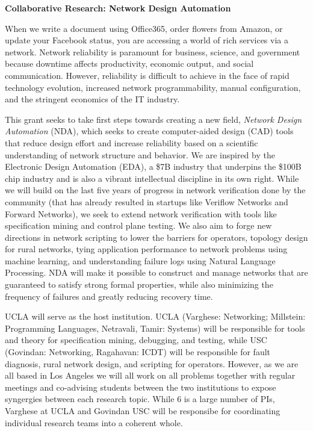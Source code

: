 \centerline{\large\textbf{Collaborative Research: Network Design Automation}}
\bigskip

When we write a document using Office365, order flowers from Amazon, or update your Facebook status, you are accessing a world of rich services via a network. Network reliability is paramount for business, science, and government because downtime affects productivity, economic output, and social communication. However, reliability is difficult to achieve in the face of rapid technology evolution, increased network programmability, manual configuration, and the stringent economics of the IT industry.

This grant seeks to take first steps towards creating a new field, \emph{Network Design Automation} (NDA), which seeks to create computer-aided design (CAD) tools that reduce design effort and increase reliability based on a scientific understanding of network structure and behavior. We are inspired by the Electronic Design Automation (EDA), a \$7B industry that underpins the \$100B chip industry and is also a vibrant intellectual discipline in its own right.  While we will build on 
the last five years of progress in network verification done by the community (that has already resulted in startups like
Veriflow Networks and Forward Networks), we seek to extend network verification with tools like specification mining
and control plane testing.  We also aim to forge new directions in network scripting to lower the barriers for operators, topology design for rural networks, tying application performance to network problems using machine learning, and 
understanding failure logs using Natural Language Processing.  NDA will make it possible to construct and manage networks that are guaranteed to satisfy strong formal properties, while also minimizing the frequency of failures and greatly reducing recovery time.

UCLA will serve as the host institution. UCLA (Varghese: Networking; Millstein: Programming Languages, Netravali, Tamir: Systems) will be responsible for tools and theory for specification mining, debugging, and testing, while USC  (Govindan: Networking, Ragahavan: ICDT) will be responsible for fault diagnosis, rural network design, and scripting for operators.  However, as we are all based in Los Angeles we will all work on all problems together with regular meetings and co-advising students between the two institutions to expose syngergies between each research topic.  While 6 is a large number of PIs, Varghese at UCLA and Govindan USC will be responsibe for coordinating individual research teams into a coherent whole.

